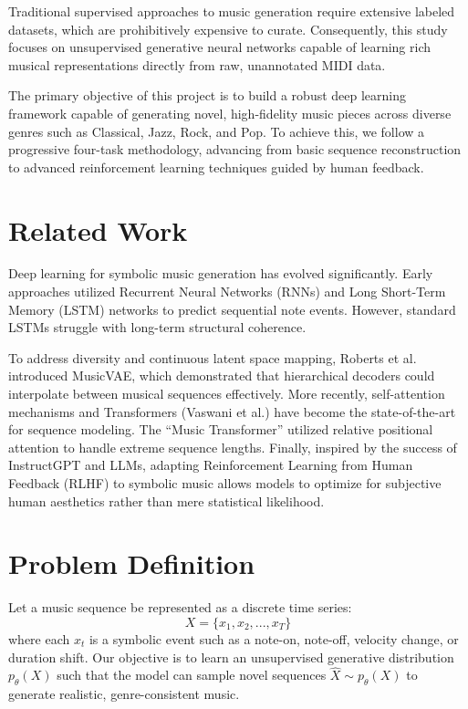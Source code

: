 \documentclass[conference]{IEEEtran}
\begin{document}
Traditional supervised approaches to music generation require extensive labeled datasets, which are prohibitively expensive to curate. Consequently, this study focuses on unsupervised generative neural networks capable of learning rich musical representations directly from raw, unannotated MIDI data. 

The primary objective of this project is to build a robust deep learning framework capable of generating novel, high-fidelity music pieces across diverse genres such as Classical, Jazz, Rock, and Pop. To achieve this, we follow a progressive four-task methodology, advancing from basic sequence reconstruction to advanced reinforcement learning techniques guided by human feedback.

\section{Related Work}
Deep learning for symbolic music generation has evolved significantly. Early approaches utilized Recurrent Neural Networks (RNNs) and Long Short-Term Memory (LSTM) networks to predict sequential note events. However, standard LSTMs struggle with long-term structural coherence. 

To address diversity and continuous latent space mapping, Roberts et al. introduced MusicVAE, which demonstrated that hierarchical decoders could interpolate between musical sequences effectively. More recently, self-attention mechanisms and Transformers (Vaswani et al.) have become the state-of-the-art for sequence modeling. The ``Music Transformer'' utilized relative positional attention to handle extreme sequence lengths. Finally, inspired by the success of InstructGPT and LLMs, adapting Reinforcement Learning from Human Feedback (RLHF) to symbolic music allows models to optimize for subjective human aesthetics rather than mere statistical likelihood.

\section{Problem Definition}
Let a music sequence be represented as a discrete time series:
\begin{equation}
X=\{x_{1},x_{2},...,x_{T}\}
\end{equation}
where each $x_{t}$ is a symbolic event such as a note-on, note-off, velocity change, or duration shift. Our objective is to learn an unsupervised generative distribution $p_{\theta}(X)$ such that the model can sample novel sequences $\hat{X}\sim p_{\theta}(X)$ to generate realistic, genre-consistent music.
\end{document}
